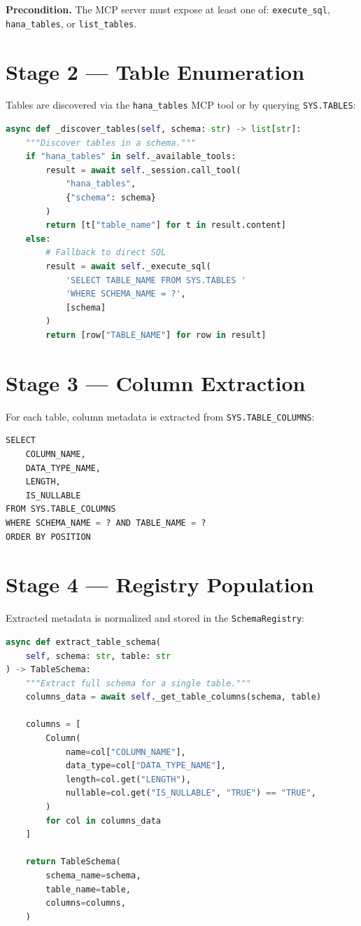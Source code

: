 \textbf{Precondition.} The MCP server must expose at least one of: \texttt{execute\_sql},
\texttt{hana\_tables}, or \texttt{list\_tables}.

\section{Stage 2 --- Table Enumeration}

Tables are discovered via the \texttt{hana\_tables} MCP tool or by querying
\texttt{SYS.TABLES}:

\begin{lstlisting}[language=Python,caption={Table discovery (hana\_schema\_extractor.py, lines 85--105)}]
async def _discover_tables(self, schema: str) -> list[str]:
    """Discover tables in a schema."""
    if "hana_tables" in self._available_tools:
        result = await self._session.call_tool(
            "hana_tables",
            {"schema": schema}
        )
        return [t["table_name"] for t in result.content]
    else:
        # Fallback to direct SQL
        result = await self._execute_sql(
            'SELECT TABLE_NAME FROM SYS.TABLES '
            'WHERE SCHEMA_NAME = ?',
            [schema]
        )
        return [row["TABLE_NAME"] for row in result]
\end{lstlisting}

\section{Stage 3 --- Column Extraction}

For each table, column metadata is extracted from \texttt{SYS.TABLE\_COLUMNS}:

\begin{lstlisting}[language=Python,caption={Column extraction SQL}]
SELECT 
    COLUMN_NAME,
    DATA_TYPE_NAME,
    LENGTH,
    IS_NULLABLE
FROM SYS.TABLE_COLUMNS
WHERE SCHEMA_NAME = ? AND TABLE_NAME = ?
ORDER BY POSITION
\end{lstlisting}

\section{Stage 4 --- Registry Population}

Extracted metadata is normalized and stored in the \texttt{SchemaRegistry}:

\begin{lstlisting}[language=Python,caption={Registry population (hana\_schema\_extractor.py, lines 140--165)}]
async def extract_table_schema(
    self, schema: str, table: str
) -> TableSchema:
    """Extract full schema for a single table."""
    columns_data = await self._get_table_columns(schema, table)
    
    columns = [
        Column(
            name=col["COLUMN_NAME"],
            data_type=col["DATA_TYPE_NAME"],
            length=col.get("LENGTH"),
            nullable=col.get("IS_NULLABLE", "TRUE") == "TRUE",
        )
        for col in columns_data
    ]
    
    return TableSchema(
        schema_name=schema,
        table_name=table,
        columns=columns,
    )
\end{lstlisting}

